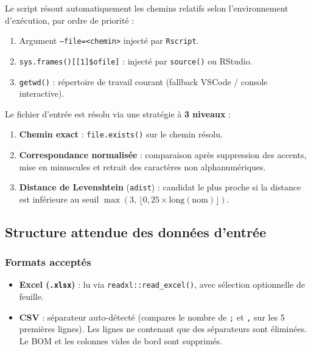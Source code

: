 \documentclass[11pt,a4paper]{article}
\begin{document}
Le script résout automatiquement les chemins relatifs selon l'environnement d'exécution,
par ordre de priorité :

\begin{enumerate}[label=\arabic*.]
  \item Argument \texttt{--file=<chemin>} injecté par \texttt{Rscript}.
  \item \texttt{sys.frames()[[1]\$ofile]} : injecté par \texttt{source()} ou RStudio.
  \item \texttt{getwd()} : répertoire de travail courant (fallback VSCode / console interactive).
\end{enumerate}

Le fichier d'entrée est résolu via une stratégie à \textbf{3 niveaux} :

\begin{enumerate}[label=\arabic*.]
  \item \textbf{Chemin exact} : \texttt{file.exists()} sur le chemin résolu.
  \item \textbf{Correspondance normalisée} : comparaison après suppression des accents, mise en minuscules et retrait des caractères non alphanumériques.
  \item \textbf{Distance de Levenshtein} (\texttt{adist}) : candidat le plus proche si la distance est inférieure au seuil $\max(3,\, \lfloor 0{,}25 \times \text{long}(\text{nom})\rfloor)$.
\end{enumerate}

\subsection{Structure attendue des données d'entrée}

\subsubsection{Formats acceptés}

\begin{itemize}
  \item \textbf{Excel (\texttt{.xlsx})} : lu via \texttt{readxl::read\_excel()}, avec sélection optionnelle de feuille.
  \item \textbf{CSV} : séparateur auto-détecté (compares le nombre de \texttt{;} et \texttt{,} sur les 5 premières lignes). Les lignes ne contenant que des séparateurs sont éliminées. Le BOM et les colonnes vides de bord sont supprimés.
\end{itemize}
\end{document}
